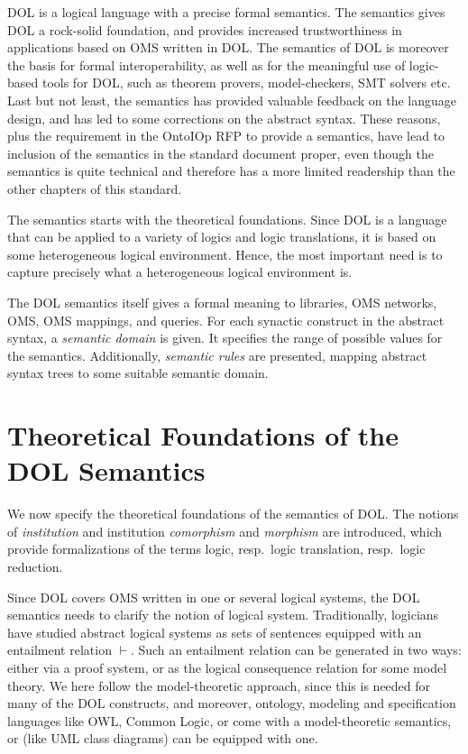 \documentclass[10pt,fleqn,%
\ifpretendfinal
final%
\else
draft%
\fi,
]{scrreprt}
\newcommand*{\termref}[1]{\index{#1}#1\xspace}
\newcommand{\sclause}[1]{\section{#1}}
\begin{document}
DOL is a logical language with a precise formal semantics.  The
semantics gives DOL a rock-solid foundation, and provides increased
trustworthiness in applications based on OMS written in DOL.  The
semantics of DOL is moreover the basis for formal interoperability, as
well as for the meaningful use of logic-based tools for DOL, such as
theorem provers, model-checkers, SMT solvers etc.  Last but not least,
the semantics has provided valuable feedback on the language design,
and has led to some corrections on the abstract syntax.  These
reasons, plus the requirement in the OntoIOp RFP to provide a
semantics, have lead to inclusion of the semantics in the standard
document proper, even though the semantics is quite technical and
therefore has a more limited readership than the other chapters of
this standard.

The semantics starts with the theoretical foundations. Since DOL is a
language that can be applied to a variety of logics and logic
translations, it is based on some heterogeneous logical environment.
Hence, the most important need is to capture precisely what a
heterogeneous logical environment is.

The DOL semantics itself gives a formal meaning to libraries, OMS
networks, OMS, OMS mappings, and queries. For each synactic construct
in the abstract syntax,
a \emph{semantic domain} is given. It specifies the range of possible
values for the semantics. Additionally, \emph{semantic rules} are
presented, mapping abstract syntax trees to some suitable semantic
domain.

\sclause{Theoretical Foundations of the DOL Semantics}
\label{s:foundations}

We now specify the theoretical foundations of the semantics of DOL.
The notions of \emph{institution} and institution 
\emph{comorphism} and \emph{morphism} are introduced, which provide formalizations of the terms 
\termref{logic}, resp.\ \termref{logic translation}, resp.\  \termref{logic reduction}. 

Since DOL covers OMS written in one or several logical systems, the
DOL semantics needs to clarify the notion of logical
system. Traditionally, logicians have studied abstract logical systems
as sets of sentences equipped with an entailment relation
$\vdash$. Such an entailment relation can be generated in two ways:
either via a proof system, or as the logical consequence relation for
some model theory.  We here follow the model-theoretic approach, since
this is needed for many of the DOL constructs, and moreover, ontology,
modeling and specification languages like OWL, Common Logic, or \CASL
come with a model-theoretic semantics, or (like UML class diagrams)
can be equipped with one.
\end{document}
